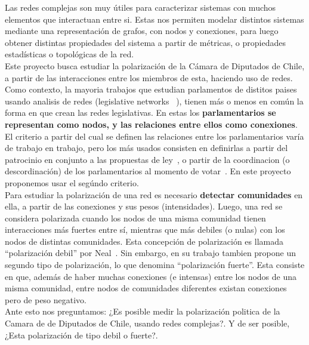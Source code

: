 \documentclass{proyectotesis}
\begin{document}
Las redes complejas son muy útiles para caracterizar sistemas con muchos elementos que interactuan entre si. Estas nos permiten modelar distintos sistemas mediante una representación de grafos, con nodos y conexiones, para luego obtener distintas propiedades del sistema a partir de métricas, o propiedades estadísticas o topológicas de la red.\\

Este proyecto busca estudiar la polarización de la Cámara de Diputados de Chile, a partir de las interacciones entre los miembros de esta, haciendo uso de redes. 
Como contexto, la mayoria trabajos que estudian parlamentos de distitos paises usando analisis de redes (legislative networks~\cite{Neal_2020, Waugh_2009, Aleman_2013, Zhang_2008, Fowler_2006, Andris_2015, Briatte_2016, LeFoulon_2019}
), tienen más o menos en común la forma en que crean las redes legislativas. En estas los \textbf{parlamentarios se representan como nodos, y las relaciones entre ellos como conexiones}. El criterio a partir del cual se definen las relaciones entre los parlamentarios varía de trabajo en trabajo, pero los más usados consisten en definirlas a partir del patrocinio en conjunto a las propuestas de ley~\cite{Neal_2020, Zhang_2008, LeFoulon_2019,Fowler_2006}, o partir de la coordinacion (o descordinación) de los parlamentarios al momento de votar~\cite{Waugh_2009, Andris_2015}. En este proyecto proponemos usar el segúndo criterio.\\

Para estudiar la polarización de una red es necesario \textbf{detectar comunidades} en ella, a partir de las conexiones y sus pesos (intensidades). Luego, una red se considera polarizada cuando los nodos de una misma comunidad tienen interacciones más fuertes entre sí, mientras que más debiles (o nulas) con los nodos de distintas comunidades. Esta concepción de polarización es llamada ``polarización debil'' por Neal~\cite{Neal_2020}. Sin embargo, en su trabajo tambien propone un segundo tipo de polarización, lo que denomina ``polarización fuerte''. Esta consiste en que, además de haber muchas conexiones (e intensas) entre los nodos de una misma comunidad, entre nodos de comunidades diferentes existan conexiones pero de peso negativo.\\

Ante esto nos preguntamos: ¿Es posible medir la polarización politica de la Camara de de Diputados de Chile, usando redes complejas?. Y de ser posible, ¿Esta polarización de tipo debil o fuerte?.\\
\end{document}
